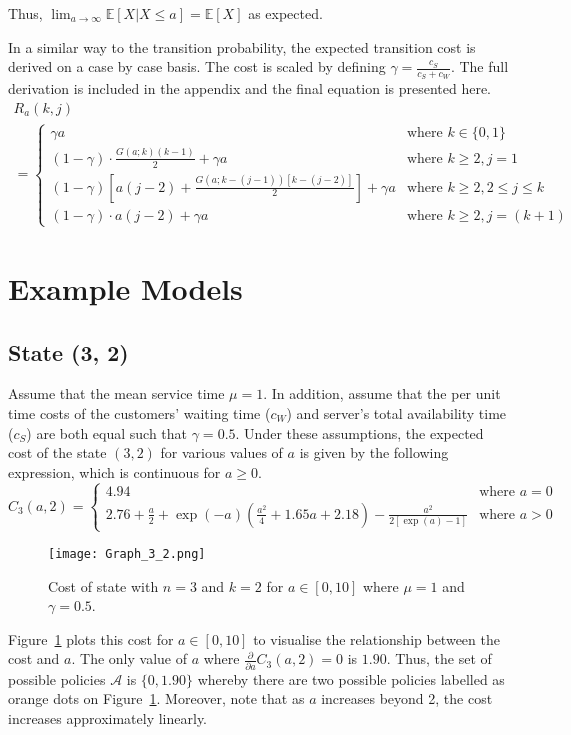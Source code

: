 Thus, $\displaystyle \lim_{a \to \infty} \mathbb{E} [X | X \leq a] = \mathbb{E} [X]$ as expected.

In a similar way to the transition probability, the expected transition cost is derived on a case by case basis. The cost is scaled by defining $\gamma = \frac{c_{S}}{c_{S} + c_{W}}$. The full derivation is included in the appendix and the final equation is presented here.
\begin{multline}
	R_{a} (k, j) \\
	= \begin{cases}
		\gamma a & \text{where $k \in \{ 0, 1 \}$} \\
		(1 - \gamma) \cdot \frac{G (a; k) (k - 1)}{2} + \gamma a & \text{where $k \geq 2, j = 1$} \\
		(1 - \gamma) \left[ a (j - 2) + \frac{G (a; k - (j - 1)) [k - (j - 2)]}{2} \right] + \gamma a & \text{where $k \geq 2, 2 \leq j \leq k$} \\
		(1 - \gamma) \cdot a (j - 2) + \gamma a & \text{where $k \geq 2, j = (k + 1)$}
	\end{cases}
\end{multline}

\section{Example Models}
\subsection{State (3, 2)}
Assume that the mean service time $\mu = 1$. In addition, assume that the per unit time costs of the customers' waiting time ($c_{W}$) and server's total availability time ($c_{S}$) are both equal such that $\gamma = 0.5$. Under these assumptions, the expected cost of the state $(3, 2)$ for various values of $a$ is given by the following expression, which is continuous for $a \geq 0$.
\begin{equation*}
	C_{3} (a, 2) =
	\begin{cases}
 		4.94 & \text{where $a = 0$} \\
 		2.76 + \frac{a}{2} + \exp (- a) \left( \frac{a^{2}}{4} + 1.65 a + 2.18 \right) - \frac{a^{2}}{2 [\exp (a) - 1]} & \text{where $a > 0$}
	\end{cases}
\end{equation*}

\begin{figure}[htb]
	\centering
	\texttt{[image: Graph\_3\_2.png]}
	\caption{Cost of state with $n = 3$ and $k = 2$ for $a \in [0, 10]$ where $\mu = 1$ and $\gamma = 0.5$.}
	\label{Graph_3_2}
\end{figure}
Figure~\ref{Graph_3_2} plots this cost for $a \in [0, 10]$ to visualise the relationship between the cost and $a$. The only value of $a$ where $\frac{\partial}{\partial a} C_{3} (a, 2) = 0$ is $1.90$. Thus, the set of possible policies $\mathcal{A}$ is $\{ 0, 1.90 \}$ whereby there are two possible policies labelled as orange dots on Figure~\ref{Graph_3_2}. Moreover, note that as $a$ increases beyond 2, the cost increases approximately linearly.

